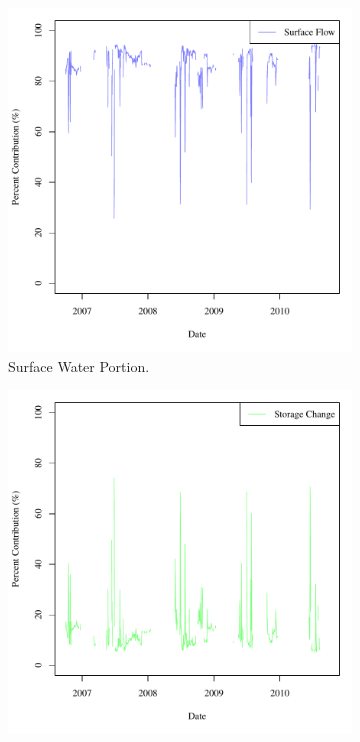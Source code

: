 \begin{linenumbers}
\begin{figure}[htbp]
\centering
	\begin{subfigure}{0.5\textwidth}
		\centering
		\includegraphics[width=0.9\linewidth]{"Figures/Results_DSR/M Mass Contrib 1"}
		\caption{Surface Water Portion.}
		\label{sub:DSRMSurf}
	\end{subfigure}%
	\begin{subfigure}{0.5\textwidth}
		\centering
		\includegraphics[width=0.9\linewidth]{"Figures/Results_DSR/M Mass Contrib 2"}

\end{subfigure}
\end{figure}
\end{linenumbers}

